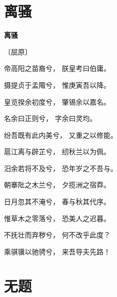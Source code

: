 \documentclass[12pt,UTF-8,openany,fontset=none]{ctexbook}
\begin{document}
\vspace{8pt}
\clearpage

\section{离骚}


\begin{center}
    {\bfseries 离骚}

    \vspace{18pt}

    \begin{large}\xuwen
        〔屈原〕
    \end{large}

\end{center}

    \vspace{18pt}  %

\begin{center}
    \begin{Large}

        帝高阳之苗裔兮， 朕皇考曰伯庸。

        摄提贞于孟陬兮， 惟庚寅吾以降。

        皇览揆余初度兮， 肇锡余以嘉名。

        名余曰正则兮， 字余曰灵均。

        纷吾既有此内美兮， 又重之以修能。\hspace{5pt}

        扈江离与辟芷兮， 纫秋兰以为佩。

        \hspace{18pt}汨余若将不及兮， 恐年岁之不吾与。

        朝搴阰之木兰兮， 夕揽洲之宿莽。

        日月忽其不淹兮， 春与秋其代序。

        惟草木之零落兮， 恐美人之迟暮。

        不抚壮而弃秽兮， 何不改乎此度？

        乘骐骥以驰骋兮， 来吾导夫先路！

    \end{Large}

\end{center}

\vspace{8pt}
\clearpage

\section{无题}
\end{document}
